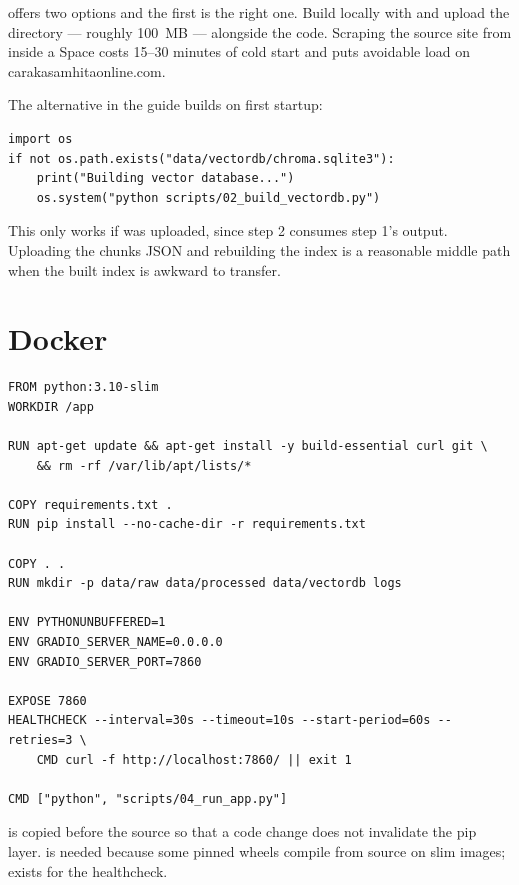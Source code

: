  offers two options and the first is the right one. Build  locally with  and upload the directory --- roughly 100~MB --- alongside the code. Scraping the source site from inside a Space costs 15--30 minutes of cold start and puts avoidable load on carakasamhitaonline.com.

The alternative in the guide builds on first startup:

\begin{lstlisting}[style=py]
import os
if not os.path.exists("data/vectordb/chroma.sqlite3"):
    print("Building vector database...")
    os.system("python scripts/02_build_vectordb.py")
\end{lstlisting}

This only works if  was uploaded, since step 2 consumes step 1's output. Uploading the chunks JSON and rebuilding the index is a reasonable middle path when the built index is awkward to transfer.

\section{Docker}

\begin{lstlisting}[style=shell]
FROM python:3.10-slim
WORKDIR /app

RUN apt-get update && apt-get install -y build-essential curl git \
    && rm -rf /var/lib/apt/lists/*

COPY requirements.txt .
RUN pip install --no-cache-dir -r requirements.txt

COPY . .
RUN mkdir -p data/raw data/processed data/vectordb logs

ENV PYTHONUNBUFFERED=1
ENV GRADIO_SERVER_NAME=0.0.0.0
ENV GRADIO_SERVER_PORT=7860

EXPOSE 7860
HEALTHCHECK --interval=30s --timeout=10s --start-period=60s --retries=3 \
    CMD curl -f http://localhost:7860/ || exit 1

CMD ["python", "scripts/04_run_app.py"]
\end{lstlisting}

 is copied before the source so that a code change does not invalidate the pip layer.  is needed because some pinned wheels compile from source on slim images;  exists for the healthcheck.


